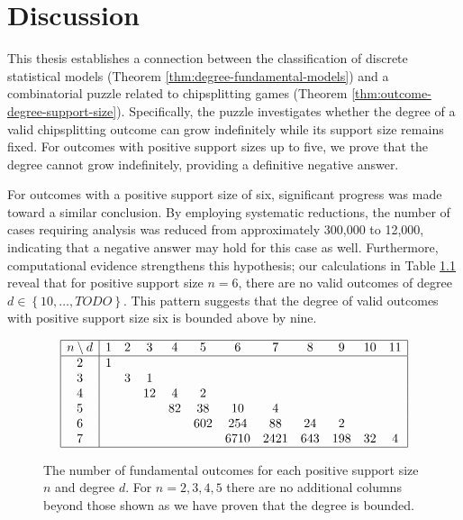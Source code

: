 \chapter{Discussion}

This thesis establishes a connection between the classification of discrete statistical models (Theorem \ref{thm:degree-fundamental-models}) and a combinatorial puzzle related to chipsplitting games (Theorem \ref{thm:outcome-degree-support-size}). Specifically, the puzzle investigates whether the degree of a valid chipsplitting outcome can grow indefinitely while its support size remains fixed. For outcomes with positive support sizes up to five, we prove that the degree cannot grow indefinitely, providing a definitive negative answer.

For outcomes with a positive support size of six, significant progress was made toward a similar conclusion. By employing systematic reductions, the number of cases requiring analysis was reduced from approximately 300,000 to 12,000, indicating that a negative answer may hold for this case as well. Furthermore, computational evidence strengthens this hypothesis; our calculations in Table \ref{table:computed-fundamental-models} reveal that for positive support size $n=6$, there are no valid outcomes of degree $d \in \left\{ 10, \dots, TODO \right\}$. This pattern suggests that the degree of valid outcomes with positive support size six is bounded above by nine.


\begin{figure}[H]
    \centering
    \[
    \begin{array}{|c|ccccccccccc|}
    \hline
    n \setminus d & 1 & 2 & 3 & 4 & 5 & 6 & 7 & 8 & 9 & 10 & 11 \\
    \hline
    2 & 1 &   &   &   &   &    &    &    &    &     &     \\
    3 &   & 3 & 1 &   &   &    &    &    &    &     &     \\
    4 &   &   & 12 & 4 & 2 &    &    &    &    &     &     \\
    5 &   &   &    & 82 & 38 & 10 & 4  &    &    &     &     \\
    6 &   &   &    &    & 602 & 254 & 88 & 24 & 2  &     &     \\
    7 &   &   &    &    &     & 6710 & 2421 & 643 & 198 & 32  & 4   \\
    \hline
    \end{array}
    \]
    \caption{The number of fundamental outcomes for each positive support size \( n \) and degree \( d \). For \( n = 2, 3, 4, 5 \) there are no additional columns beyond those shown as we have proven that the degree is bounded.}
    \label{table:computed-fundamental-models}
    \end{figure}
    

